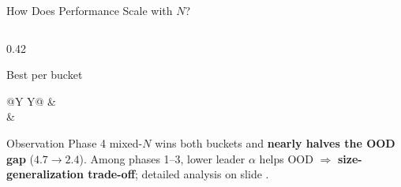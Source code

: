\documentclass[aspectratio=169,11pt]{beamer}
\begin{document}
\begin{frame}[t]{How Does Performance Scale with $N$?}
\begin{columns}[T,onlytextwidth]
\begin{column}{0.42\textwidth}
\begin{block}{Best per bucket}
\begin{tabularx}{\linewidth}{@{}Y Y@{}}
          \midrule
            &  \\
            &  \\
          \bottomrule
        \end{tabularx}
      \end{block}
      \begin{alertblock}{Observation}
        \scriptsize
        Phase 4 mixed-$N$ wins both buckets and \textbf{nearly halves the OOD gap} ($4.7\!\to\!2.4$). Among phases 1--3, lower leader $\alpha$ helps OOD $\Rightarrow$ \textbf{size-generalization trade-off}; detailed analysis on slide \pageref{fig:size-gen-tradeoff}.
      \end{alertblock}
    \end{column}
  \end{columns}
\end{frame}
\end{document}
